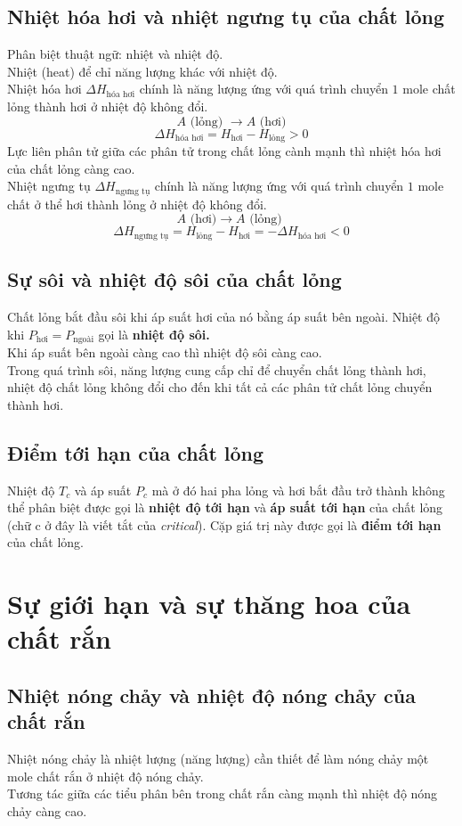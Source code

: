 \subsection{Nhiệt hóa hơi và nhiệt ngưng tụ của chất lỏng}
Phân biệt thuật ngữ: nhiệt và nhiệt độ.\\
Nhiệt (heat) để chỉ năng lượng khác với nhiệt độ.\\
Nhiệt hóa hơi $\Delta H_{\text{hóa hơi}}$ chính là năng lượng ứng với quá trình chuyển $1$ mole chất lỏng thành hơi ở nhiệt độ không đổi.
$$A \text{ (lỏng) } \to A \text{ (hơi)}$$
$$\Delta H_{\text{hóa hơi}} = H_{\text{hơi}} - H_{\text{lỏng}} > 0$$
Lực liên phân tử giữa các phân tử trong chất lỏng cành mạnh thì nhiệt hóa hơi của chất lỏng càng cao.\\
Nhiệt ngưng tụ $\Delta H_{\text{ngưng tụ}}$ chính là năng lượng ứng với quá trình chuyển $1$ mole chất ở thể hơi thành lỏng ở nhiệt độ không đổi.
$$A \text{ (hơi)} \to A \text{ (lỏng) }$$
$$\Delta H_{\text{ngưng tụ}} = H_{\text{lỏng}} - H_{\text{hơi}} = - \Delta H_{\text{hóa hơi}} < 0$$
\subsection{Sự sôi và nhiệt độ sôi của chất lỏng}
Chất lỏng bắt đầu sôi khi áp suất hơi của nó bằng áp suất bên ngoài. Nhiệt độ khi $P_{\text{hơi}} = P_{\text{ngoài}}$ gọi là \textbf{nhiệt độ sôi.}\\
Khi áp suất bên ngoài càng cao thì nhiệt độ sôi càng cao.\\
Trong quá trình sôi, năng lượng cung cấp chỉ để chuyển chất lỏng thành hơi, nhiệt độ chất lỏng không đổi cho đến khi tất cả các phân tử chất lỏng chuyển thành hơi.
\subsection{Điểm tới hạn của chất lỏng}
Nhiệt độ $T_c$ và áp suất $P_c$ mà ở đó hai pha lỏng và  hơi bắt đầu trở thành không thể phân biệt được gọi là \textbf{nhiệt độ tới hạn} và\textbf{ áp suất tới hạn} của chất lỏng (chữ c ở đây là viết tắt của \textit{critical}). Cặp giá trị này được gọi là \textbf{điểm tới hạn} của chất lỏng.
\section{Sự giới hạn và sự thăng hoa của chất rắn}
\subsection{Nhiệt nóng chảy và nhiệt độ nóng chảy của chất rắn}
Nhiệt nóng chảy là nhiệt lượng (năng lượng) cần thiết để làm nóng chảy một mole chất rắn ở nhiệt độ nóng chảy.\\
Tương tác giữa các tiểu phân bên trong chất rắn càng mạnh thì nhiệt độ nóng chảy càng cao.
